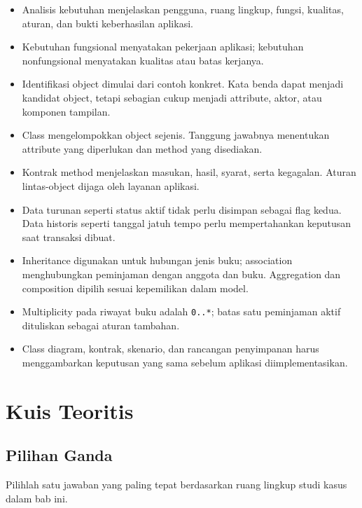 \begin{itemize}
  \item Analisis kebutuhan menjelaskan pengguna, ruang lingkup, fungsi, kualitas, aturan, dan bukti keberhasilan aplikasi.
  \item Kebutuhan fungsional menyatakan pekerjaan aplikasi; kebutuhan nonfungsional menyatakan kualitas atau batas kerjanya.
  \item Identifikasi object dimulai dari contoh konkret. Kata benda dapat menjadi kandidat object, tetapi sebagian cukup menjadi attribute, aktor, atau komponen tampilan.
  \item Class mengelompokkan object sejenis. Tanggung jawabnya menentukan attribute yang diperlukan dan method yang disediakan.
  \item Kontrak method menjelaskan masukan, hasil, syarat, serta kegagalan. Aturan lintas-object dijaga oleh layanan aplikasi.
  \item Data turunan seperti status aktif tidak perlu disimpan sebagai flag kedua. Data historis seperti tanggal jatuh tempo perlu mempertahankan keputusan saat transaksi dibuat.
  \item Inheritance digunakan untuk hubungan jenis buku; association menghubungkan peminjaman dengan anggota dan buku. Aggregation dan composition dipilih sesuai kepemilikan dalam model.
  \item Multiplicity pada riwayat buku adalah \texttt{0..*}; batas satu peminjaman aktif dituliskan sebagai aturan tambahan.
  \item Class diagram, kontrak, skenario, dan rancangan penyimpanan harus menggambarkan keputusan yang sama sebelum aplikasi diimplementasikan.
\end{itemize}

\section{Kuis Teoritis}

\subsection{Pilihan Ganda}

Pilihlah satu jawaban yang paling tepat berdasarkan ruang lingkup studi kasus dalam bab ini.

